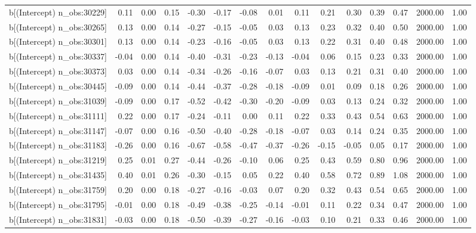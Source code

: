 \begin{table}[ht]
\begin{tabular}{rrrrrrrrrrrrrrr}
  b[(Intercept) n\_obs:30229] & 0.11 & 0.00 & 0.15 & -0.30 & -0.17 & -0.08 & 0.01 & 0.11 & 0.21 & 0.30 & 0.39 & 0.47 & 2000.00 & 1.00 \\ 
  b[(Intercept) n\_obs:30265] & 0.13 & 0.00 & 0.14 & -0.27 & -0.15 & -0.05 & 0.03 & 0.13 & 0.23 & 0.32 & 0.40 & 0.50 & 2000.00 & 1.00 \\ 
  b[(Intercept) n\_obs:30301] & 0.13 & 0.00 & 0.14 & -0.23 & -0.16 & -0.05 & 0.03 & 0.13 & 0.22 & 0.31 & 0.40 & 0.48 & 2000.00 & 1.00 \\ 
  b[(Intercept) n\_obs:30337] & -0.04 & 0.00 & 0.14 & -0.40 & -0.31 & -0.23 & -0.13 & -0.04 & 0.06 & 0.15 & 0.23 & 0.33 & 2000.00 & 1.00 \\ 
  b[(Intercept) n\_obs:30373] & 0.03 & 0.00 & 0.14 & -0.34 & -0.26 & -0.16 & -0.07 & 0.03 & 0.13 & 0.21 & 0.31 & 0.40 & 2000.00 & 1.00 \\ 
  b[(Intercept) n\_obs:30445] & -0.09 & 0.00 & 0.14 & -0.44 & -0.37 & -0.28 & -0.18 & -0.09 & 0.01 & 0.09 & 0.18 & 0.26 & 2000.00 & 1.00 \\ 
  b[(Intercept) n\_obs:31039] & -0.09 & 0.00 & 0.17 & -0.52 & -0.42 & -0.30 & -0.20 & -0.09 & 0.03 & 0.13 & 0.24 & 0.32 & 2000.00 & 1.00 \\ 
  b[(Intercept) n\_obs:31111] & 0.22 & 0.00 & 0.17 & -0.24 & -0.11 & 0.00 & 0.11 & 0.22 & 0.33 & 0.43 & 0.54 & 0.63 & 2000.00 & 1.00 \\ 
  b[(Intercept) n\_obs:31147] & -0.07 & 0.00 & 0.16 & -0.50 & -0.40 & -0.28 & -0.18 & -0.07 & 0.03 & 0.14 & 0.24 & 0.35 & 2000.00 & 1.00 \\ 
  b[(Intercept) n\_obs:31183] & -0.26 & 0.00 & 0.16 & -0.67 & -0.58 & -0.47 & -0.37 & -0.26 & -0.15 & -0.05 & 0.05 & 0.17 & 2000.00 & 1.00 \\ 
  b[(Intercept) n\_obs:31219] & 0.25 & 0.01 & 0.27 & -0.44 & -0.26 & -0.10 & 0.06 & 0.25 & 0.43 & 0.59 & 0.80 & 0.96 & 2000.00 & 1.00 \\ 
  b[(Intercept) n\_obs:31435] & 0.40 & 0.01 & 0.26 & -0.30 & -0.15 & 0.05 & 0.22 & 0.40 & 0.58 & 0.72 & 0.89 & 1.08 & 2000.00 & 1.00 \\ 
  b[(Intercept) n\_obs:31759] & 0.20 & 0.00 & 0.18 & -0.27 & -0.16 & -0.03 & 0.07 & 0.20 & 0.32 & 0.43 & 0.54 & 0.65 & 2000.00 & 1.00 \\ 
  b[(Intercept) n\_obs:31795] & -0.01 & 0.00 & 0.18 & -0.49 & -0.38 & -0.25 & -0.14 & -0.01 & 0.11 & 0.22 & 0.34 & 0.47 & 2000.00 & 1.00 \\ 
  b[(Intercept) n\_obs:31831] & -0.03 & 0.00 & 0.18 & -0.50 & -0.39 & -0.27 & -0.16 & -0.03 & 0.10 & 0.21 & 0.33 & 0.46 & 2000.00 & 1.00 \\ 

\end{tabular}
\end{table}

